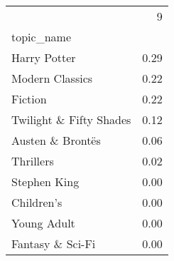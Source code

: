 \begin{tabular}{lr}
\toprule
{} &    9 \\
topic\_name              &      \\
\midrule
Harry Potter            & 0.29 \\
Modern Classics         & 0.22 \\
Fiction                 & 0.22 \\
Twilight \& Fifty Shades & 0.12 \\
Austen \& Brontës        & 0.06 \\
Thrillers               & 0.02 \\
Stephen King            & 0.00 \\
Children's              & 0.00 \\
Young Adult             & 0.00 \\
Fantasy \& Sci-Fi        & 0.00 \\
\bottomrule
\end{tabular}
